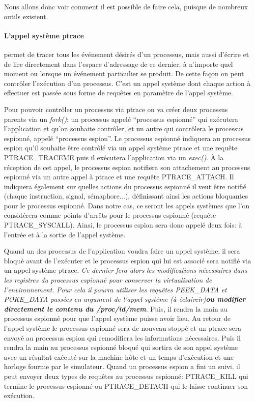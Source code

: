  Nous allons donc voir comment il est possible de faire cela, puisque de
 nombreux outils existent.
 
 \paragraph{L'appel système ptrace}\citet{AS:Interception, MARION:Interception}
 permet de tracer tous les événement désirés d'un processus, mais aussi d'écrire
 et de lire directement dans l'espace d'adressage de ce dernier, à n'importe
 quel moment ou lorsque un événement particulier se produit. De cette façon on
 peut contrôler l'exécution d'un processus. C'est un appel système dont chaque
 action à effectuer est passée sous forme de requêtes en paramètre de l'appel
 système.

Pour pouvoir contrôler un processus via ptrace on va créer deux processus
parents via un \textit{fork()}; un processus appelé ``processus espionné'' qui
exécutera l'application et qu'on souhaite contrôler, et un autre qui contrôlera
le processus espionné, appelé ``processus espion''. Le processus espionné
indiquera au processus espion qu'il souhaite être contrôlé via un appel système
ptrace et une requête PTRACE\_TRACEME puis il exécutera l'application via un
\textit{exec()}. À la réception de cet appel, le processus espion notifiera son
attachement au processus espionné via un autre appel à ptrace et une requête
PTRACE\_ATTACH. Il indiquera également sur quelles actions du processus espionné
il veut être notifié (chaque instruction, signal, sémaphore...), définissant
ainsi les actions bloquantes pour le processus espionné. Dans notre cas, ce
seront les appels systèmes que l'on considérera comme points d'arrêts pour le
processus espionné (requête PTRACE\_SYSCALL). Ainsi, le processus espion sera
donc appelé deux fois: à l'entrée et à la sortie de l'appel système.

Quand un des processus de l'application voudra faire un appel système, il sera
bloqué avant de l'exécuter et le processus espion qui lui est associé sera
notifié via un appel système ptrace. \textit{Ce dernier fera alors les modifications
nécessaires dans les registres du processus espionné pour conserver la
virtualisation de l'environnement. Pour cela il pourra utiliser les requêtes
PEEK\_DATA et POKE\_DATA passées en argument de l'appel système {\color{red} (à éclaircir)\textbf{ou
  modifier directement le contenu du /proc/id/mem}}}. Puis, il rendra la main
au processus espionné pour que l'appel système puisse avoir lieu. Au retour de
l'appel système le processus espionné sera de nouveau stoppé et un ptrace sera
envoyé au processus espion qui remodifiera les informations nécessaires. Puis il
rendra la main au processus espionné bloqué qui sortira de son appel système
avec un résultat exécuté sur la machine hôte et un temps d'exécution et une
horloge fournie par le simulateur. Quand un processus espion a fini un suivi, il
peut envoyer deux types de requêtes au processus espionné: PTRACE\_KILL qui
termine le processus espionné ou PTRACE\_DETACH qui le laisse continuer son
exécution.

